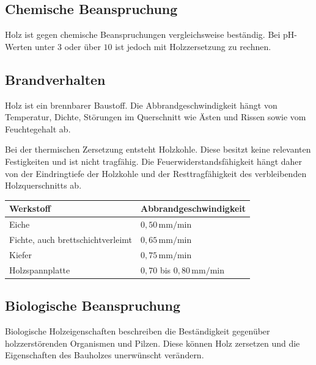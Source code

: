 \documentclass[
  12pt,
  a4paper,
  oneside
]{scrreprt}
\begin{document}
\subsection{Chemische Beanspruchung}

Holz ist gegen chemische Beanspruchungen vergleichsweise beständig.
Bei pH-Werten unter $3$ oder über $10$ ist jedoch mit Holzzersetzung zu
rechnen. 

\subsection{Brandverhalten}

Holz ist ein brennbarer Baustoff. Die Abbrandgeschwindigkeit hängt von
Temperatur, Dichte, Störungen im Querschnitt wie Ästen und Rissen sowie
vom Feuchtegehalt ab. 

Bei der thermischen Zersetzung entsteht Holzkohle. Diese besitzt keine
relevanten Festigkeiten und ist nicht tragfähig. Die
Feuerwiderstandsfähigkeit hängt daher von der Eindringtiefe der
Holzkohle und der Resttragfähigkeit des verbleibenden Holzquerschnitts
ab. 

\begin{longtable}{
  >{\raggedright\arraybackslash}p{}
  >{\centering\arraybackslash}p{}
}
\toprule
\textbf{Werkstoff} &
\textbf{Abbrandgeschwindigkeit} \\
\midrule
\endhead

Eiche &
$0{,}50\,\mathrm{mm/min}$ \\

Fichte, auch brettschichtverleimt &
$0{,}65\,\mathrm{mm/min}$ \\

Kiefer &
$0{,}75\,\mathrm{mm/min}$ \\

Holzspannplatte &
$0{,}70$ bis $0{,}80\,\mathrm{mm/min}$ \\

\bottomrule
\end{longtable}



\subsection{Biologische Beanspruchung}

Biologische Holzeigenschaften beschreiben die Beständigkeit gegenüber
holzzerstörenden Organismen und Pilzen. Diese können Holz zersetzen und
die Eigenschaften des Bauholzes unerwünscht verändern.
\end{document}
